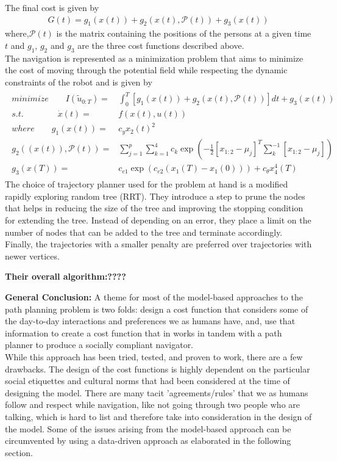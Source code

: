 The final cost is given by 
\begin{align}
G(t) = g_{1}(x(t)) + g_{2}(x(t), \mathcal{P}(t)) + g_{3}(x(t))
\end{align}
where,$\mathcal{P}(t)$ is the matrix containing the positions of the persons at a given time $t$ and $g_{1}$, $g_{2}$ and $g_{3}$ are the three cost functions described above.\\
The navigation is represented as a minimization problem that aims to minimize the cost of moving through the potential field while respecting the dynamic constraints of the robot and is given by
\begin{align}
\begin{split}
minimize \qquad I(\tilde{u}_{0:T}) = &\int_{0}^{T} [g_{1}(x(t)) + g_{2}(x(t), \mathcal{P}(t))]dt + g_{3}(x(t))\\
s.t. \qquad \qquad \dot{x}(t) = & f(x(t),u(t)) \\
where \qquad g_{1}(x(t)) = &c_{y}x_{2}(t)^{2}\\
g_{2}((x(t)), \mathcal{P}(t)) = &\sum_{j=1}^{p} \sum_{k=1}^{4} c_{k}\exp(-\frac{1}{2}[x_{1:2} - \mu_{j}]^{T}\sum^{-1}_{k}[x_{1:2} - \mu_{j}])\\
g_{3}(x(T)) = & c_{e1}\exp(c_{e2}(x_{1}(T) - x_{1}(0))) + c_{\theta}x_{4}^{4}(T)
\end{split}
\end{align}
The choice of trajectory planner used for the problem at hand is a modified rapidly exploring random tree (RRT). They introduce a step to prune the nodes that helps in reducing the size of the tree and improving the stopping condition for extending the tree. Instead of depending on an error, they place a limit on the number of nodes that can be added to the tree and terminate accordingly. Finally, the trajectories with a smaller penalty are preferred over trajectories with newer vertices.

\textbf{Their overall algorithm:????}

\textbf{General Conclusion:}
A theme for most of the model-based approaches to the path planning problem is two folds: design a cost function that considers some of the day-to-day interactions and preferences we as humans have, and, use that information to create a cost function that in works in tandem with a path planner to produce a socially compliant navigator.\\
While this approach has been tried, tested, and proven to work, there are a few drawbacks. The design of the cost functions is highly dependent on the particular social etiquettes and cultural norms that had been considered at the time of designing the model. There are many tacit 'agreements/rules' that we as humans follow and respect while navigation, like not going through two people who are talking, which is hard to list and therefore take into consideration in the design of the model. Some of the issues arising from the model-based approach can be circumvented by using a data-driven approach as elaborated in the following section.












